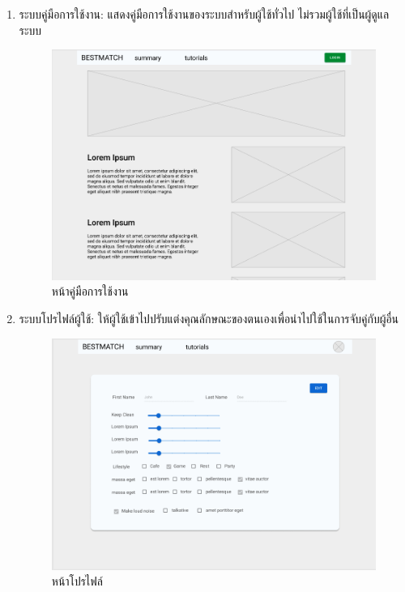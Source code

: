 \begin{enumerate}
  \clearpage
  \item ระบบคู่มือการใช้งาน: แสดงคู่มือการใช้งานของระบบสำหรับผู้ใช้ทั่วไป ไม่รวมผู้ใช้ที่เป็นผู้ดูแลระบบ
  \begin{figure}[h]
  \begin{center}
  \includegraphics[width=\linewidth]{photo/student/tutorial.png}
  \end{center}
  \caption{หน้าคู่มือการใช้งาน}
  \label{fig:guideline}
  \end{figure}

  \clearpage
  \item ระบบโปรไฟล์ผู้ใช้: ให้ผู้ใช้เข้าไปปรับแต่งคุณลักษณะของตนเองเพื่อนำไปใช้ในการจับคู่กับผู้อื่น
  \begin{figure}[h]
  \begin{center}
  \includegraphics[width=\linewidth]{photo/student/profile.png}
  \end{center}
  \caption{หน้าโปรไฟล์}
  \label{fig:profile}
  \end{figure}
  
\end{enumerate}

